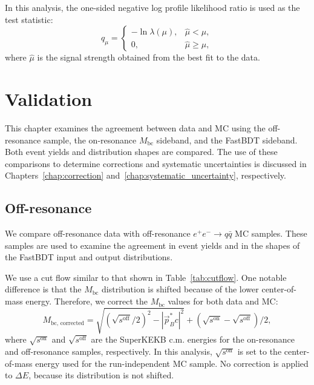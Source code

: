 In this analysis, the one-sided negative log profile likelihood ratio is used as the test statistic:
\begin{equation}
    q_{\mu} =
    \begin{cases}
        -\ln\lambda(\mu), & \hat{\mu} < \mu,\\
        0, & \hat{\mu} \geq \mu,
    \end{cases}
\end{equation}
where $\hat{\mu}$ is the signal strength obtained from the best fit to the data.

\chapter{Validation}
\label{chap:validation}
This chapter examines the agreement between data and MC using the off-resonance sample, the on-resonance $M_{\textrm{bc}}$ sideband, and the FastBDT sideband.
Both event yields and distribution shapes are compared.
The use of these comparisons to determine corrections and systematic uncertainties is discussed in Chapters~\ref{chap:correction} and~\ref{chap:systematic_uncertainty}, respectively.

\section{Off-resonance}
\label{sec:off_resonance}
We compare off-resonance data with off-resonance $e^{+}e^{-}\rightarrow q\bar{q}$ MC samples.
These samples are used to examine the agreement in event yields and in the shapes of the FastBDT input and output distributions.

We use a cut flow similar to that shown in Table~\ref{tab:cutflow}.
One notable difference is that the $M_{\textrm{bc}}$ distribution is shifted because of the lower center-of-mass energy.
Therefore, we correct the $M_{\textrm{bc}}$ values for both data and MC:
\begin{equation}
  \label{eq:Mbc_corr}
  M_{\textrm{bc, corrected}} = \sqrt{(\sqrt{s^{\textrm{off}}}/2)^{2}-|\vec{p}_{B}^{*}c|^{2}}+(\sqrt{s^{\textrm{on}}}-\sqrt{s^{\textrm{off}}})/2,
\end{equation}
where $\sqrt{s^{\textrm{on}}}$ and $\sqrt{s^{\textrm{off}}}$ are the SuperKEKB c.m. energies for the on-resonance and off-resonance samples, respectively.
In this analysis, $\sqrt{s^{\textrm{on}}}$ is set to the center-of-mass energy used for the run-independent MC sample.
No correction is applied to $\Delta E$, because its distribution is not shifted.

